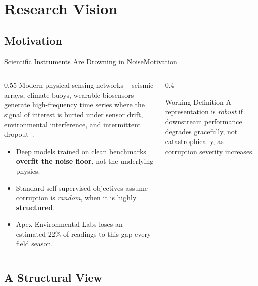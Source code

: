 \section{Research Vision}
\subsection{Motivation}

\begin{frame}{Scientific Instruments Are Drowning in Noise}{Motivation}
  \small
  \begin{columns}[T]
    \begin{column}{0.55\textwidth}
      Modern physical sensing networks -- seismic arrays, climate buoys, wearable
      biosensors -- generate high-frequency time series where the signal of interest
      is buried under sensor drift, environmental interference, and intermittent
      dropout~\cite{chen2023seismic}.

      \vspace{0.08cm}
      \begin{itemize}
        \item Deep models trained on clean benchmarks \textbf{overfit the noise
          floor}, not the underlying physics.
        \item Standard self-supervised objectives assume corruption is
          \emph{random}, when it is highly \textbf{structured}.
        \item Apex Environmental Labs loses an estimated 22\% of readings
          to this gap every field season.
      \end{itemize}
    \end{column}
    \begin{column}{0.4\textwidth}
      \begin{notebox}{Working Definition}
        A representation is \emph{robust} if downstream performance degrades
        gracefully, not catastrophically, as corruption severity increases.
      \end{notebox}
    \end{column}
  \end{columns}
\end{frame}

\subsection{A Structural View}

